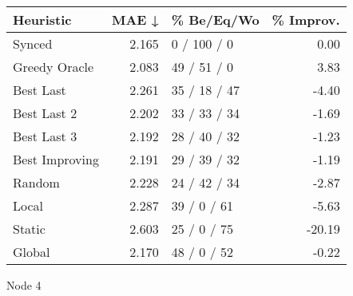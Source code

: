 \begin{tabular}{lrlr}
\toprule
\textbf{Heuristic} & \textbf{MAE ↓} & \textbf{\% Be/Eq/Wo} & \textbf{\% Improv.} \\
\midrule
            Synced &          2.165 &          0 / 100 / 0 &                0.00 \\
     Greedy Oracle &          2.083 &          49 / 51 / 0 &                3.83 \\
         Best Last &          2.261 &         35 / 18 / 47 &               -4.40 \\
       Best Last 2 &          2.202 &         33 / 33 / 34 &               -1.69 \\
       Best Last 3 &          2.192 &         28 / 40 / 32 &               -1.23 \\
    Best Improving &          2.191 &         29 / 39 / 32 &               -1.19 \\
            Random &          2.228 &         24 / 42 / 34 &               -2.87 \\
             Local &          2.287 &          39 / 0 / 61 &               -5.63 \\
            Static &          2.603 &          25 / 0 / 75 &              -20.19 \\
            Global &          2.170 &          48 / 0 / 52 &               -0.22 \\
\bottomrule
\end{tabular}
\caption{Node 4}
\label{tab:hr_iid_lr05_le2_bs2_4}
